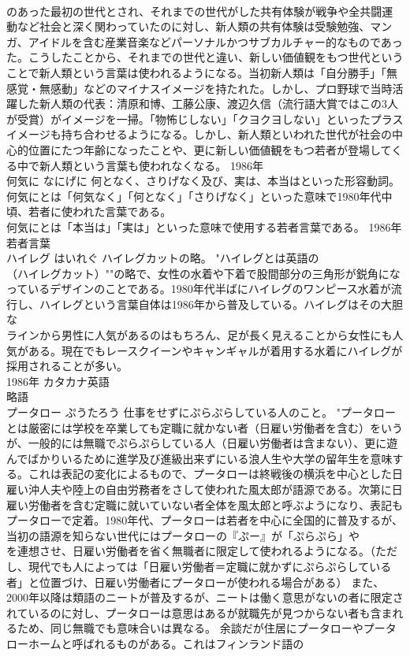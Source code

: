\documentclass[8pt]{extreport}
\begin{document}
\begin{CJK}{UTF8}{min}
\\	のあった最初の世代とされ、それまでの世代がした共有体験が戦争や全共闘運動など社会と深く関わっていたのに対し、新人類の共有体験は受験勉強、マンガ、アイドルを含む産業音楽などパーソナルかつサブカルチャー的なものであった。こうしたことから、それまでの世代と違い、新しい価値観をもつ世代ということで新人類という言葉は使われるようになる。当初新人類は「自分勝手」「無感覚・無感動」などのマイナスイメージを持たれた。しかし、プロ野球で当時活躍した新人類の代表：清原和博、工藤公康、渡辺久信（流行語大賞ではこの3人が受賞）がイメージを一掃。「物怖じしない」「クヨクヨしない」といったプラスイメージも持ち合わせるようになる。しかし、新人類といわれた世代が社会の中心的位置にたつ年齢になったことや、更に新しい価値観をもつ若者が登場してくる中で新人類という言葉も使われなくなる。	1986年	
\\	何気に	なにげに	何となく、さりげなく及び、実は、本当はといった形容動詞。	
\\	何気にとは「何気なく」「何となく」「さりげなく」といった意味で1980年代中頃、若者に使われた言葉である。 
\\	何気にとは「本当は」「実は」といった意味で使用する若者言葉である。	1986年	若者言葉	
\\	ハイレグ	はいれぐ	ハイレグカットの略。	"ハイレグとは英語の
\\	（ハイレグカット）""の略で、女性の水着や下着で股間部分の三角形が鋭角になっているデザインのことである。1980年代半ばにハイレグのワンピース水着が流行し、ハイレグという言葉自体は1986年から普及している。ハイレグはその大胆な
\\	ラインから男性に人気があるのはもちろん、足が長く見えることから女性にも人気がある。現在でもレースクイーンやキャンギャルが着用する水着にハイレグが採用されることが多い。
\\	1986年	カタカナ英語 
\\	略語	
\\	プータロー	ぷうたろう	仕事をせずにぷらぷらしている人のこと。	"プータローとは厳密には学校を卒業しても定職に就かない者（日雇い労働者を含む）をいうが、一般的には無職でぷらぷらしている人（日雇い労働者は含まない）、更に遊んでばかりいるために進学及び進級出来ずにいる浪人生や大学の留年生を意味する。これは表記の変化によるもので、プータローは終戦後の横浜を中心とした日雇い沖人夫や陸上の自由労務者をさして使われた風太郎が語源である。次第に日雇い労働者を含む定職に就いていない者全体を風太郎と呼ぶようになり、表記もプータローで定着。1980年代、プータローは若者を中心に全国的に普及するが、当初の語源を知らない世代にはプータローの『ぷー』が「ぷらぷら」や
\\	を連想させ、日雇い労働者を省く無職者に限定して使われるようになる。（ただし、現代でも人によっては「日雇い労働者＝定職に就かずにぷらぷらしている者」と位置づけ、日雇い労働者にプータローが使われる場合がある） また、2000年以降は類語のニートが普及するが、ニートは働く意思がないの者に限定されているのに対し、プータローは意思はあるが就職先が見つからない者も含まれるため、同じ無職でも意味合いは異なる。 余談だが住居にプータローやプータローホームと呼ばれるものがある。これはフィンランド語の

\end{CJK}
\end{document}

